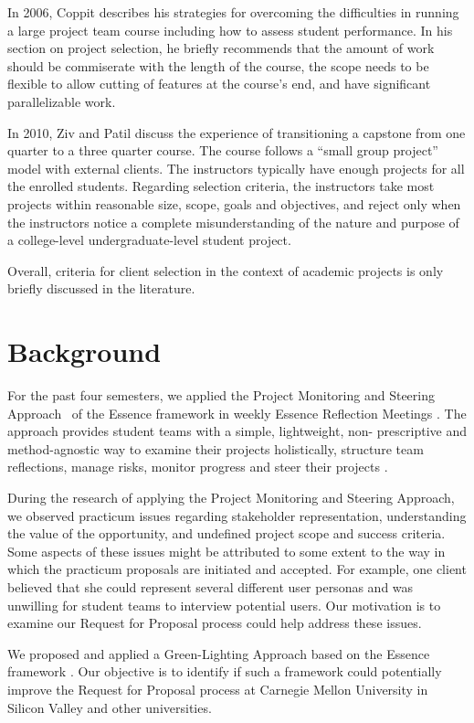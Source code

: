 In 2006, Coppit \cite{coppit2006} describes his strategies for overcoming the difficulties in running a large project team course including how to assess student performance. In his section on project selection, he briefly recommends that the amount of work should be commiserate with the length of the course, the scope needs to be flexible to allow cutting of features at the course's end, and have significant parallelizable work. 

In 2010, Ziv and Patil \cite {ziv2010capstone} discuss the experience of transitioning a capstone from one quarter to a three quarter course. The course follows a ``small group project'' model with external clients. The instructors typically have enough projects for all the enrolled students. Regarding selection criteria, the instructors take most projects within reasonable size, scope, goals and objectives, and reject only when the instructors notice a complete misunderstanding of the nature and purpose of a college-level undergraduate-level student project. 

Overall, criteria for client selection in the context of academic projects is only briefly discussed in the literature. 

\section{Background}
\label{Background}
For the past four semesters, we applied the Project Monitoring and
Steering Approach ~of the Essence framework
\cite{EssenceBook} in weekly Essence Reflection
Meetings \cite{EASE2014}. The approach provides student
teams with a simple, lightweight, non- prescriptive and method-agnostic
way to examine their projects holistically, structure team reflections,
manage risks, monitor progress and steer their projects
\cite{ICSE2014}.

During the research of applying the Project Monitoring and Steering
Approach, we observed practicum issues regarding stakeholder
representation, understanding the value of the opportunity, and undefined project scope and success criteria. Some aspects of these issues might be attributed to some extent to the way in which the practicum proposals are initiated and accepted. For example, one client believed that she could represent several different user personas and was unwilling for student teams to interview potential users. Our motivation is to examine our Request for Proposal process could help address these issues.

We proposed and applied a Green-Lighting Approach based on the Essence framework \cite{EssenceBook}. Our objective is to identify if such a framework could potentially improve the Request for Proposal process at Carnegie Mellon University in Silicon Valley and other universities.

